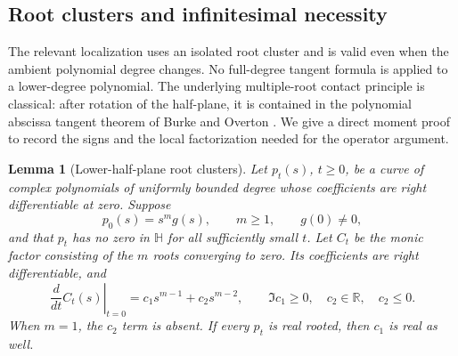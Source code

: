 \documentclass[reqno]{amsart}
\newtheorem{lemma}[theorem]{Lemma}
\theoremstyle{definition}
\theoremstyle{remark}
\newcommand{\R}{\mathbb R}
\newcommand{\HH}{\mathbb H}
\begin{document}
\subsection{Root clusters and infinitesimal necessity}
\label{gen:subsec-roots}

The relevant localization uses an isolated root cluster and is valid
even when the ambient polynomial degree changes.  No full-degree
tangent formula is applied to a lower-degree polynomial.
The underlying multiple-root contact principle is classical:
after rotation of the half-plane, it is contained in the polynomial
abscissa tangent theorem of Burke and Overton
\cite[Theorem~1.2 and Lemma~1.4]{BurkeOverton01}.
We give a direct moment proof to record the signs and the local
factorization needed for the operator argument.

\begin{lemma}[Lower-half-plane root clusters]
\label{gen:cluster-moments}
Let \(p_t(s)\), \(t\geq0\), be a curve of complex polynomials of uniformly
bounded degree whose coefficients are right differentiable at zero.
Suppose
\[
 p_0(s)=s^m g(s),\qquad m\geq1,\qquad g(0)\neq0,
\]
and that \(p_t\) has no zero in \(\HH\) for all sufficiently small \(t\).
Let \(C_t\) be the monic factor consisting of the \(m\) roots converging
to zero.  Its coefficients are right differentiable, and
\begin{equation}
 \left.\frac{d}{dt}C_t(s)\right|_{t=0}
 =c_1s^{m-1}+c_2s^{m-2},
 \qquad
 \Im c_1\geq0,\quad c_2\in\R,\quad c_2\leq0.
 \label{gen:eq-cluster-variation}
\end{equation}
When \(m=1\), the \(c_2\) term is absent.  If every \(p_t\) is real
rooted, then \(c_1\) is real as well.
\end{lemma}
\end{document}
